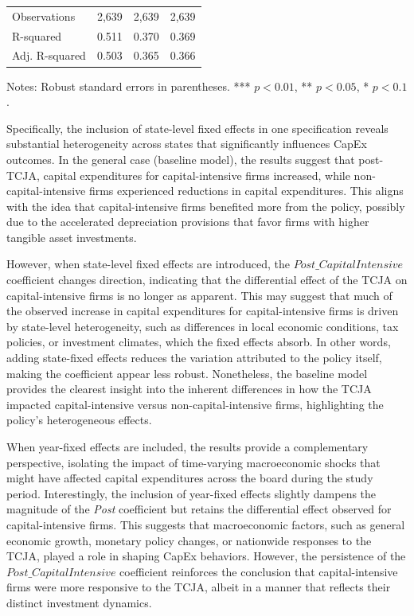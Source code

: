 \documentclass[11pt]{article}
\begin{document}
\begin{table}[htbp]
\begin{tabular}{lccc}
        \midrule
        Observations          & 2,639       & 2,639       & 2,639       \\
        R-squared             & 0.511       & 0.370       & 0.369       \\
        Adj. R-squared        & 0.503       & 0.365       & 0.366       \\
        \bottomrule
    \end{tabular}
    \begin{flushleft}
        \footnotesize
        Notes: Robust standard errors in parentheses. *** \(p<0.01\), ** \(p<0.05\), * \(p<0.1\).
    \end{flushleft}
\end{table}


Specifically, the inclusion of state-level fixed effects in one specification reveals substantial heterogeneity across states that significantly influences CapEx outcomes. In the general case (baseline model), the results suggest that post-TCJA, capital expenditures for capital-intensive firms increased, while non-capital-intensive firms experienced reductions in capital expenditures. This aligns with the idea that capital-intensive firms benefited more from the policy, possibly due to the accelerated depreciation provisions that favor firms with higher tangible asset investments.

However, when state-level fixed effects are introduced, the $Post\_CapitalIntensive$ coefficient changes direction, indicating that the differential effect of the TCJA on capital-intensive firms is no longer as apparent. This may suggest that much of the observed increase in capital expenditures for capital-intensive firms is driven by state-level heterogeneity, such as differences in local economic conditions, tax policies, or investment climates, which the fixed effects absorb. In other words, adding state-fixed effects reduces the variation attributed to the policy itself, making the coefficient appear less robust. Nonetheless, the baseline model provides the clearest insight into the inherent differences in how the TCJA impacted capital-intensive versus non-capital-intensive firms, highlighting the policy’s heterogeneous effects.

When year-fixed effects are included, the results provide a complementary perspective, isolating the impact of time-varying macroeconomic shocks that might have affected capital expenditures across the board during the study period. Interestingly, the inclusion of year-fixed effects slightly dampens the magnitude of the \textit{Post} coefficient but retains the differential effect observed for capital-intensive firms. This suggests that macroeconomic factors, such as general economic growth, monetary policy changes, or nationwide responses to the TCJA, played a role in shaping CapEx behaviors. However, the persistence of the $Post\_CapitalIntensive$ coefficient reinforces the conclusion that capital-intensive firms were more responsive to the TCJA, albeit in a manner that reflects their distinct investment dynamics.
\end{document}

